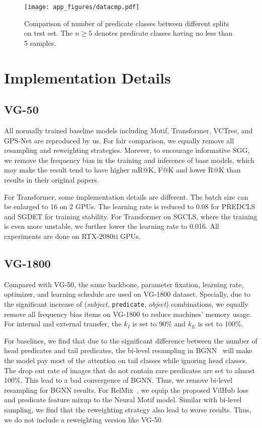\documentclass[runningheads]{llncs}
\begin{document}
\begin{figure}[t]
    \centering
    \texttt{[image: app\_figures/datacmp.pdf]}
    \caption{Comparison of number of predicate classes between different splits on test set. The $n \geq 5$ denotes predicate classes having no less than 5 samples.}
    \label{fig:data_cmp}
\end{figure}

\section{Implementation Details}
\subsection{VG-50}
All normally trained baseline models including Motif, Transformer, VCTree, and GPS-Net are reproduced by us.
For fair comparison, we equally remove all resampling and reweighting strategies.
Morever, to encourage informative SGG, we remove the frequency bias in the training and inference of base models, which may make the result tend to have higher mR@K, F@K and lower R@K than results in their original papers.

For Transformer, some implementation details are different. 
The batch size can be enlarged to 16 on 2 GPUs.
The learning rate is reduced to 0.08 for PREDCLS and SGDET for training stability.
For Transformer on SGCLS, where the training is even more unstable, we further lower the learning rate to 0.016.
All experiments are done on RTX-2080ti GPUs. 

\subsection{VG-1800}
Compared with VG-50, the same backbone, parameter fixation, learning rate, optimizer, and learning schedule are used on VG-1800 dataset.
Specially, due to the significant increase of (\textit{subject}, \texttt{predicate}, \textit{object}) combinations, we equally remove all frequency bias items on VG-1800 to reduce machines' memory usage.
For internal and external transfer, the $k_I$ is set to 90\% and $k_E$ is set to 100\%.

For baselines, we find that due to the significant difference between the number of head predicates and tail predicates, the bi-level resampling in BGNN~\cite{li2021bipartite} will make the model pay most of the attention on tail classes while ignoring head classes.
The drop out rate of images that do not contain rare predicates are set to almost 100\%.
This lead to a bad convergence of BGNN.
Thus, we remove bi-level resampling for BGNN results.
For RelMix~\cite{abdelkarim2020long}, we equip the proposed VilHub loss and predicate feature mixup to the Neural Motif model.
Similar with bi-level sampling, we find that the reweighting strategy also lead to worse results.
Thus, we do not include a reweighting version like VG-50.
\end{document}
